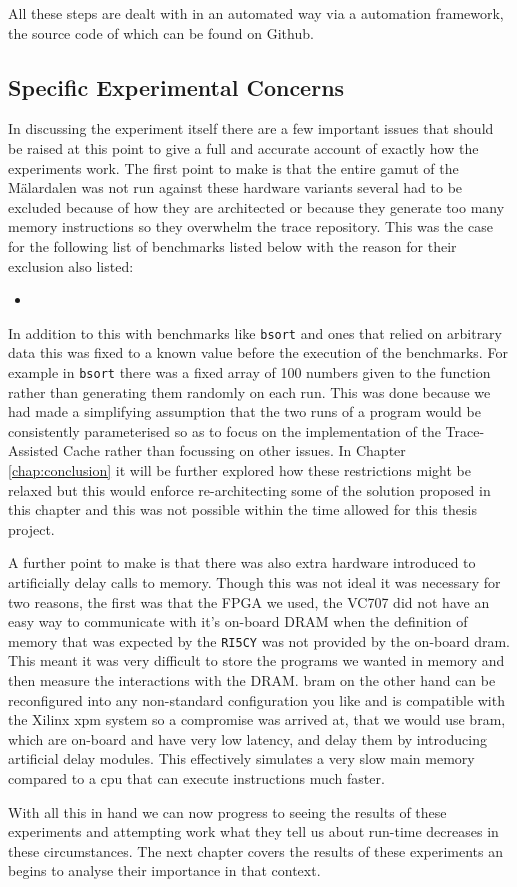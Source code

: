 All these steps are dealt with in an automated way via a automation framework, the source code of which can be found on Github. 

\subsection{Specific Experimental Concerns}

In discussing the experiment itself there are a few important issues that should be raised at this point to give a full and accurate account of exactly how the experiments work. The first point to make is that the entire gamut of the Mälardalen was not run against these hardware variants several had to be excluded because of how they are architected or because they generate too many memory instructions so they overwhelm the trace repository. This was the case for the following list of benchmarks listed below with the reason for their exclusion also listed:


\begin{itemize}
	\item 
\end{itemize}
 
In addition to this with benchmarks like \texttt{bsort} and ones that relied on arbitrary data this was fixed to a known value before the execution of the benchmarks. For example in \texttt{bsort} there was a fixed array of 100 numbers given to the function rather than generating them randomly on each run. This was done because we had made a simplifying assumption that the two runs of a program would be consistently parameterised so as to focus on the implementation of the Trace-Assisted Cache rather than focussing on other issues. In Chapter \ref{chap:conclusion} it will be further explored how these restrictions might be relaxed but this would enforce re-architecting some of the solution proposed in this chapter and this was not possible within the time allowed for this thesis project.

A further point to make is that there was also extra hardware introduced to artificially delay calls to memory. Though this was not ideal it was necessary for two reasons, the first was that the FPGA we used, the VC707 did not have an easy way to communicate with it's on-board DRAM when the definition of memory that was expected by the \texttt{RI5CY} was not provided by the on-board \gls{dram}. This meant it was very difficult to store the programs we wanted in memory and then measure the interactions with the DRAM. \gls{bram} on the other hand can be reconfigured into any non-standard configuration you like and is compatible with the Xilinx \gls{xpm} system so a compromise was arrived at, that we would use \gls{bram}, which are on-board and have very low latency, and delay them by introducing artificial delay modules. This effectively simulates a very slow main memory compared to a \gls{cpu} that can execute instructions much faster.

With all this in hand we can now progress to seeing the results of these experiments and attempting work what they tell us about run-time decreases in these circumstances. The next chapter covers the results of these experiments an begins to analyse their importance in that context.
